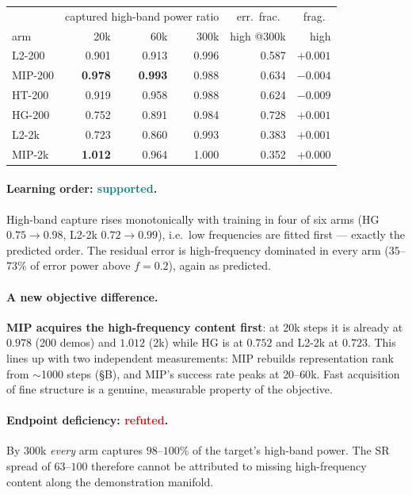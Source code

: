 \documentclass[10pt]{article}
\newcommand{\yes}{\textcolor{teal}{\textbf{supported}}}
\newcommand{\no}{\textcolor{red}{\textbf{refuted}}}
\begin{document}
\begin{center}\small
\begin{tabular}{lrrrrr}
\toprule
 & \multicolumn{3}{c}{captured high-band power ratio} & err.\ frac.\ & frag.\ \\
arm & 20k & 60k & 300k & high @300k & high \\
\midrule
L2-200  & 0.901 & 0.913 & 0.996 & 0.587 & $+0.001$ \\
MIP-200 & \textbf{0.978} & \textbf{0.993} & 0.988 & 0.634 & $-0.004$ \\
HT-200  & 0.919 & 0.958 & 0.988 & 0.624 & $-0.009$ \\
HG-200  & 0.752 & 0.891 & 0.984 & 0.728 & $+0.001$ \\
L2-2k   & 0.723 & 0.860 & 0.993 & 0.383 & $+0.001$ \\
MIP-2k  & \textbf{1.012} & 0.964 & 1.000 & 0.352 & $+0.000$ \\
\bottomrule
\end{tabular}
\end{center}

\paragraph{Learning order: \yes{}.} High-band capture rises monotonically
with training in four of six arms (HG $0.75\!\to\!0.98$, L2-2k
$0.72\!\to\!0.99$), i.e.\ low frequencies are fitted first --- exactly the
predicted order. The residual error is high-frequency dominated in every
arm ($35$--$73\%$ of error power above $f=0.2$), again as predicted.

\paragraph{A new objective difference.} \textbf{MIP acquires the
high-frequency content first}: at 20k steps it is already at $0.978$
(200 demos) and $1.012$ (2k) while HG is at $0.752$ and L2-2k at
$0.723$. This lines up with two independent measurements: MIP rebuilds
representation rank from $\sim$1000 steps (§B), and MIP's success rate
peaks at $20$--$60$k. Fast acquisition of fine structure is a genuine,
measurable property of the objective.

\paragraph{Endpoint deficiency: \no{}.} By 300k \emph{every} arm captures
$98$--$100\%$ of the target's high-band power. The SR spread of $63$--$100$
therefore cannot be attributed to missing high-frequency content along the
demonstration manifold.
\end{document}
